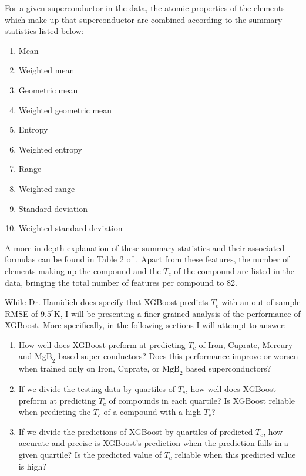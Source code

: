 \documentclass[oneside,12pt]{amsart}
\begin{document}
 For a given superconductor in the data, the atomic properties of the elements which make up that superconductor are combined according to the summary statistics listed below:
 \begin{enumerate}
     \item Mean
     \item Weighted mean
     \item Geometric mean
     \item Weighted geometric mean
     \item Entropy
     \item Weighted entropy
     \item Range
     \item Weighted range
     \item Standard deviation
     \item Weighted standard deviation
 \end{enumerate}
 
 A more in-depth explanation of these summary statistics and their associated formulas can be found in Table 2 of \cite{hamidieh_data-driven_2018}. Apart from these features, the number of elements making up the compound and the $T_c$ of the compound are listed in the data, bringing the total number of features per compound to 82.
 
 While Dr. Hamidieh does specify that XGBoost predicts $T_c$ with an out-of-sample RMSE of $9.5^\circ$K, I will be presenting a finer grained analysis of the performance of XGBoost. More specifically, in the following sections I will attempt to answer:
 
 \begin{enumerate}
     \item How well does XGBoost preform at predicting $T_c$ of Iron, Cuprate, Mercury and $\text{MgB}_2$ based super conductors? Does this performance improve or worsen when trained only on Iron, Cuprate, or $\text{MgB}_2$ based superconductors?
     \item If we divide the testing data by quartiles of $T_c$, how well does XGBoost preform at predicting $T_c$ of compounds in each quartile? Is XGBoost reliable when predicting the $T_c$ of a compound with a high $T_c$?
     \item If we divide the predictions of XGBoost by quartiles of predicted $T_c$, how accurate and precise is XGBoost's prediction when the prediction falls in a given quartile? Is the predicted value of $T_c$ reliable when this predicted value is high?
 \end{enumerate}
 
\end{document}
